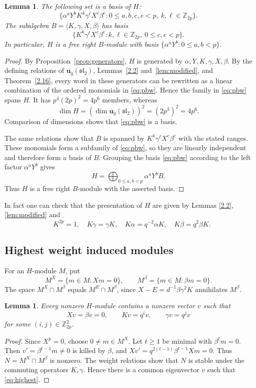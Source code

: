 \documentclass[10pt,oneside]{amsart}
\newcommand{\uq}{\mathbf{\overline{u}}_q(\mathfrak{sl_2})}
\newcommand{\Z}{\mathbb Z}
\newtheorem{lemma}[proposition]{Lemma}
\theoremstyle{definition}
\begin{document}
\begin{lemma}\label{lem:pbw}
The following set is a basis of $H$:
\begin{equation}
 \{\alpha^aY^bK^k\gamma^\ell X^c\beta^e:
 0\le a,b,c,e<p,\ k,\ell\in\Z_{2p}\}.
 \label{eq:pbw}
\end{equation}
The subalgebra $B=\langle K,\gamma,X,\beta\rangle$ has basis
\[
 \{K^k\gamma^\ell X^c\beta^e:
 k,\ell\in\Z_{2p},\ 0\le c,e<p\}.
\]
In particular, $H$ is a free right $B$-module with basis $\{\alpha^aY^b:0\le a,b<p\}$.
\end{lemma}
\begin{proof}
By Proposition~\ref{prop:generators}, $H$ is generated by
$\alpha,Y,K,\gamma,X,\beta$. By the defining relations of $\uq$, Lemmas~\ref{2.2}
and~\ref{lem:modified}, and Theorem~\ref{2.16}, every word in these generators can be
rewritten as a linear combination of the ordered monomials in
\eqref{eq:pbw}. Hence the family
in \eqref{eq:pbw} spans $H$. It has $p^4(2p)^2=4p^6$ members,
whereas
\[
 \dim H=(\dim\uq)^2=(2p^3)^2=4p^6.
\]
Comparison of dimensions shows that \eqref{eq:pbw} is a basis.

The same relations show that $B$ is spanned by
$K^k\gamma^\ell X^c\beta^e$ with the stated ranges. These monomials
form a subfamily of \eqref{eq:pbw}, so they are linearly independent
and therefore form a basis of $B$. Grouping the basis
\eqref{eq:pbw} according to the left factor $\alpha^aY^b$ gives
\[
 H=\bigoplus_{0\le a,b<p}\alpha^aY^bB.
\]
Thus $H$ is a free right $B$-module with the asserted basis.
\end{proof}
 In fact one can check that the presentation of $H$ are given by  Lemmas \ref{2.2}, \ref{lem:modified}
 and \[\quad K^{2p}=1,\quad K\gamma=\gamma K,\quad
 K\alpha=q^{-2}\alpha K,\quad K\beta=q^2\beta K.
\]
\subsection{Highest weight induced modules}
For an $H$-module $M$, put
\[
 M^X=\{m\in M:Xm=0\},\qquad M^\beta=\{m\in M:\beta m=0\}.
\]
The space $M^X\cap M^\beta$ equals $M^E\cap M^\beta$, since $X-E=d^{-1}\beta\gamma^2K$ annihilates $M^\beta$.

\begin{lemma}\label{lem:highest}
Every nonzero $H$-module contains a nonzero vector $v$ such that
\begin{equation}
 Xv=\beta v=0,\qquad Kv=q^iv,\qquad\gamma v=q^jv
 \label{eq:highest}
\end{equation}
for some $(i,j)\in\Z_{2p}^2$.
\end{lemma}
\begin{proof}
Since $X^p=0$, choose $0\ne m\in M^X$. Let $t\ge1$ be minimal with $\beta^tm=0$. Then $v'=\beta^{t-1}m\ne0$ is killed by $\beta$, and $Xv'=q^{2(t-1)}\beta^{t-1}Xm=0$. Thus $N=M^X\cap M^\beta$ is nonzero. The weight relations show that $N$ is stable under the commuting operators $K,\gamma$. Hence there is a common eigenvector $v$ such that  \eqref{eq:highest}.
\end{proof}
\end{document}
